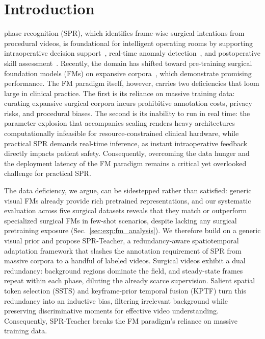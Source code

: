 \section{Introduction}
\label{sec:introduction}



 phase recognition (SPR), which identifies frame-wise surgical intentions from procedural videos, is foundational for intelligent operating rooms by supporting intraoperative decision support~\cite{vermeulen2023ultra}, real-time anomaly detection~\cite{mithany2023advancements}, and postoperative skill assessment~\cite{cao2023intelligent}. 
Recently, the domain has shifted toward pre-training surgical foundation models (FMs) on expansive corpora~\cite{batic2024endovit,yang2026large,wu2026surgmotion}, which demonstrate promising performance. 
The FM paradigm itself, however, carries two deficiencies that loom large in clinical practice. The first is its reliance on massive training data: curating expansive surgical corpora incurs prohibitive annotation costs, privacy risks, and procedural biases. The second is its inability to run in real time: the parameter explosion that accompanies scaling renders heavy architectures computationally infeasible for resource-constrained clinical hardware, while practical SPR demands real-time inference, as instant intraoperative feedback directly impacts patient safety. Consequently, overcoming the data hunger and the deployment latency of the FM paradigm remains a critical yet overlooked challenge for practical SPR.

The data deficiency, we argue, can be sidestepped rather than satisfied: generic visual FMs already provide rich pretrained representations, and our systematic evaluation across five surgical datasets reveals that they match or outperform specialized surgical FMs in few-shot scenarios, despite lacking any surgical pretraining exposure (Sec.~\ref{sec:exp:fm_analysis}). We therefore build on a generic visual prior and propose SPR-Teacher, a redundancy-aware spatiotemporal adaptation framework that slashes the annotation requirement of SPR from massive corpora to a handful of labeled videos. Surgical videos exhibit a dual redundancy: background regions dominate the field, and steady-state frames repeat within each phase, diluting the already scarce supervision. Salient spatial token selection (SSTS) and keyframe-prior temporal fusion (KPTF) turn this redundancy into an inductive bias, filtering irrelevant background while preserving discriminative moments for effective video understanding. Consequently, SPR-Teacher breaks the FM paradigm's reliance on massive training data.

